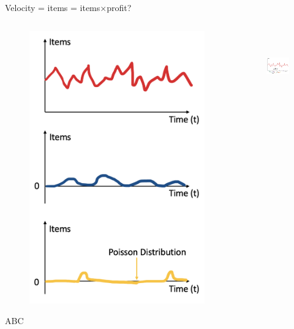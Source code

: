 \documentclass[10pt]{beamer}
\begin{document}
\begin{frame}{Velocity = items = items$\times$profit?}
\begin{columns}
\begin{column}{0.38\textwidth}  %
    \begin{figure}
    \centering
     \includegraphics[scale=0.3]{img_2/4.png}
     \end{figure}
\begin{center}
ABC
\end{center}
\end{column}
\begin{column}{0.65\textwidth}
\begin{figure}
\centering
     \includegraphics[height=30mm]{img_2/5.png}

\end{figure}
\end{column}
\end{columns}
\end{frame}
\end{document}
